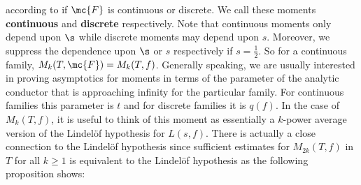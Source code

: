   according to if $\mc{F}$ is continuous or discrete. We call these moments \textbf{continuous} and \textbf{discrete} respectively. Note that continuous moments only depend upon $\s$ while discrete moments may depend upon $s$. Moreover, we suppress the dependence upon $\s$ or $s$ respectively if $s = \frac{1}{2}$. So for a continuous family, $M_{k}(T,\mc{F}) = M_{k}(T,f)$. Generally speaking, we are usually interested in proving asymptotics for moments in terms of the parameter of the analytic conductor that is approaching infinity for the particular family. For continuous families this parameter is $t$ and for discrete families it is $q(f)$. In the case of $M_{k}(T,f)$, it is useful to think of this moment as essentially a $k$-power average version of the Lindel\"of hypothesis for $L(s,f)$. There is actually a close connection to the Lindel\"of hypothesis since sufficient estimates for $M_{2k}(T,f)$ in $T$ for all $k \ge 1$ is equivalent to the Lindel\"of hypothesis as the following proposition shows:

